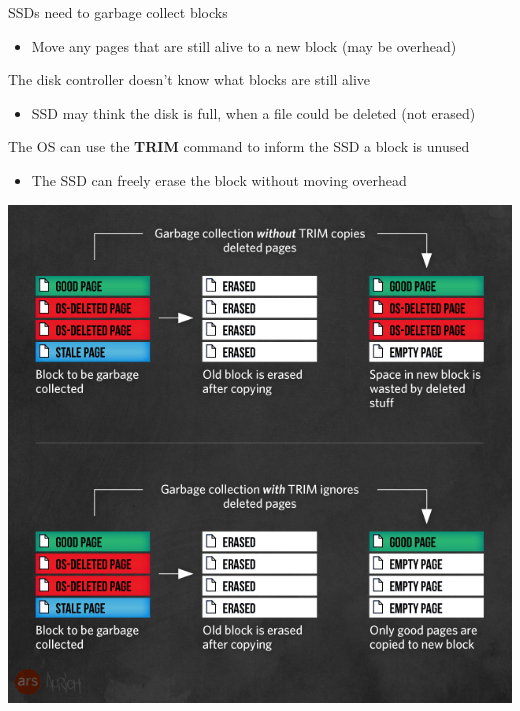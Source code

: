\begin{slide}
  

    SSDs need to garbage collect blocks
    \begin{itemize}
        \item Move any pages that are still alive to a new block (may be overhead)
    \end{itemize}
    \bigskip

    The disk controller doesn't know what blocks are still alive
    \begin{itemize}
        \item SSD may think the disk is full, when a file could be deleted (not erased)
    \end{itemize}
    \bigskip

    The OS can use the \textbf{TRIM} command to inform the SSD a block is unused
    \begin{itemize}
        \item The SSD can freely erase the block without moving overhead
    \end{itemize}

\end{slide}

\begin{slide}


    \includegraphics[height=0.75\textheight]{ssd-trim.png}

\end{slide}

